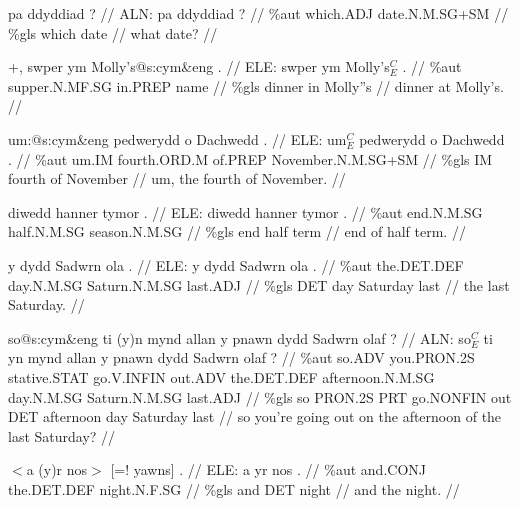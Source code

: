 \documentclass[a4paper,10pt]{article}
\begin{document}
\ex
\begingl[lingstyle=gergl]
\glchat pa ddyddiad ? //
\glsurface ALN:  pa ddyddiad ?  //
\glauto \%aut  which{\scriptsize .ADJ} date{\scriptsize .N.M.SG+SM}   //
\glmanual \%gls  which date   //
\gleng what date? //
\endgl
\xe

\ex
\begingl[lingstyle=gergl]
\glchat +, swper ym Molly's@s:cym\&eng . //
\glsurface ELE:  swper ym Molly's$^{C}_{E}$ .  //
\glauto \%aut  supper{\scriptsize .N.MF.SG} in{\scriptsize .PREP} name   //
\glmanual \%gls  dinner in Molly''s   //
\gleng dinner at Molly's. //
\endgl
\xe

\ex
\begingl[lingstyle=gergl]
\glchat um:@s:cym\&eng pedwerydd o Dachwedd . //
\glsurface ELE:  um$^{C}_{E}$ pedwerydd o Dachwedd .  //
\glauto \%aut  um{\scriptsize .IM} fourth{\scriptsize .ORD.M} of{\scriptsize .PREP} November{\scriptsize .N.M.SG+SM}   //
\glmanual \%gls  IM fourth of November   //
\gleng um, the fourth of November. //
\endgl
\xe

\ex
\begingl[lingstyle=gergl]
\glchat diwedd hanner tymor . //
\glsurface ELE:  diwedd hanner tymor .  //
\glauto \%aut  end{\scriptsize .N.M.SG} half{\scriptsize .N.M.SG} season{\scriptsize .N.M.SG}   //
\glmanual \%gls  end half term   //
\gleng end of half term. //
\endgl
\xe

\ex
\begingl[lingstyle=gergl]
\glchat y dydd Sadwrn ola . //
\glsurface ELE:  y dydd Sadwrn ola .  //
\glauto \%aut  the{\scriptsize .DET.DEF} day{\scriptsize .N.M.SG} Saturn{\scriptsize .N.M.SG} last{\scriptsize .ADJ}   //
\glmanual \%gls  DET day Saturday last   //
\gleng the last Saturday. //
\endgl
\xe

\ex
\begingl[lingstyle=gergl]
\glchat so@s:cym\&eng ti (y)n mynd allan y pnawn dydd Sadwrn olaf ? //
\glsurface ALN:  so$^{C}_{E}$ ti yn mynd allan y pnawn dydd Sadwrn olaf ?  //
\glauto \%aut  so{\scriptsize .ADV} you{\scriptsize .PRON.2S} stative{\scriptsize .STAT} go{\scriptsize .V.INFIN} out{\scriptsize .ADV} the{\scriptsize .DET.DEF} afternoon{\scriptsize .N.M.SG} day{\scriptsize .N.M.SG} Saturn{\scriptsize .N.M.SG} last{\scriptsize .ADJ}   //
\glmanual \%gls  so PRON{\scriptsize .2S} PRT go{\scriptsize .NONFIN} out DET afternoon day Saturday last   //
\gleng so you're going out on the afternoon of the last Saturday? //
\endgl
\xe

\ex
\begingl[lingstyle=gergl]
\glchat $<$a (y)r nos$>$ [=! yawns] . //
\glsurface ELE:  a yr nos .  //
\glauto \%aut  and{\scriptsize .CONJ} the{\scriptsize .DET.DEF} night{\scriptsize .N.F.SG}   //
\glmanual \%gls  and DET night   //
\gleng and the night. //
\endgl
\xe
\end{document}

